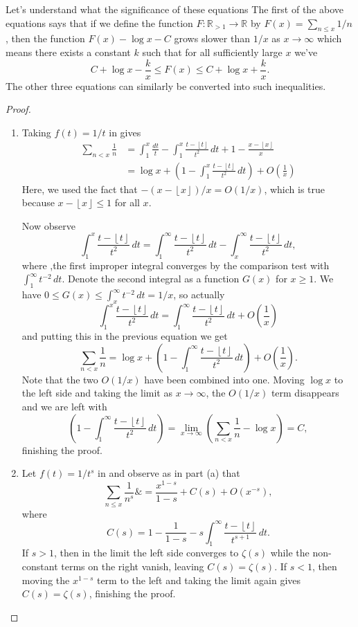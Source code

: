 \documentclass[9pt]{report}
\theoremstyle{definition}
\newcommand\RR{\mathbb R}
\newcommand\fl[1]{\left\lfloor#1\right\rfloor}
\begin{document}
Let's understand what the significance of these equations
The first of the above equations says that if we define the function \(F:\RR_{>1}\to\RR\) by \(F(x) = \sum_{n\le x} 1/n\), then the function \(F(x) - \log x - C\) grows slower than \(1/x\) as \(x\to\infty\) which means there exists a constant \(k\) such that for all sufficiently large \(x\) we've
\[C + \log x - \frac k x \le F(x) \le C + \log x + \frac k x.\]
The other three equations can similarly be converted into such inequalities.

\begin{proof}
\item
    \begin{enumerate}
        \item Taking \(f(t) = 1/t\) in  gives
            \begin{align*}
                \sum_{n<x} \frac 1 n &= \int_1^x \frac{dt}{t} - \int_1^x \frac{t-\fl t}{t^2}\,dt + 1 - \frac{x-\fl x}{x} \\
                &= \log x + \left(1 - \int_1^x \frac{t-\fl t}{t^2}\,dt\right) + O\left(\frac 1 x\right)
            \end{align*}
            Here, we used the fact that \(-(x-\fl x)/x = O(1/x)\), which is true because \(x-\fl x \le 1\) for all \(x\).

            Now observe 
            \[\int_1^x \frac{t-\fl t}{t^2}\,dt = \int_1^{\infty} \frac{t-\fl t}{t^2}\,dt - \int_x^{\infty} \frac{t-\fl t}{t^2}\,dt,\]
            where ,the first improper integral converges by the comparison test with \(\int_1^{\infty} t^{-2}\,dt\).
            Denote the second integral as a function \(G(x)\) for \(x\ge 1\).
            We have \(0\le G(x) \le \int_x^{\infty} t^{-2}\,dt = 1/x\), so actually
            \[\int_1^x \frac{t-\fl t}{t^2}\,dt = \int_1^{\infty} \frac{t-\fl t}{t^2}\,dt + O\left(\frac 1 x \right)\]
            and putting this in the previous equation we get
            \[\sum_{n<x} \frac 1 n = \log x + \left(1 - \int_1^{\infty} \frac{t-\fl t}{t^2}\,dt\right) + O\left(\frac 1 x\right).\]
            Note that the two \(O(1/x)\) have been combined into one.
            Moving \(\log x\) to the left side and taking the limit as \(x\to\infty\), the \(O(1/x)\) term disappears and we are left with
            \[\left(1 - \int_1^{\infty} \frac{t-\fl t}{t^2}\,dt\right) = \lim_{x\to\infty} \left(\sum_{n<x} \frac 1 n - \log x\right) = C,\]
            finishing the proof.

        \item Let \(f(t) = 1/t^s\) in  and observe as in part (a) that
            \[\sum_{n\le x} \frac{1}{n^s} \&= \frac{x^{1-s}}{1-s} + C(s) + O(x^{-s}),\]
            where
            \[C(s) = 1 - \frac{1}{1-s} - s\int_1^{\infty} \frac{t-\fl t}{t^{s+1}}\,dt.\]
            If \(s>1\), then in the limit the left side converges to \(\zeta(s)\) while the non-constant terms on the right vanish, leaving \(C(s) = \zeta(s)\).
            If \(s<1\), then moving the \(x^{1-s}\) term to the left and taking the limit again gives \(C(s) = \zeta(s)\), finishing the proof.


\end{enumerate}
\end{proof}
\end{document}
